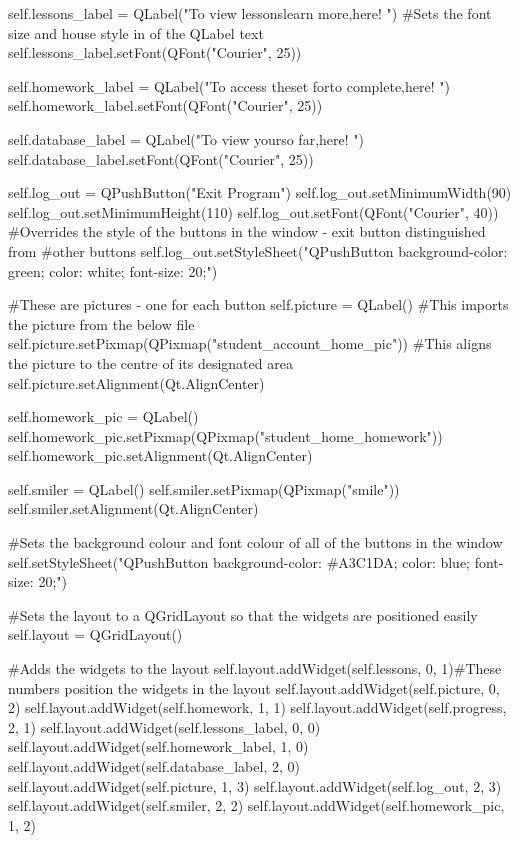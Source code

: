 \begin{landscape}
\begin{python}
        self.lessons_label = QLabel("To view lessons\nand learn more,\nclick here! ")
        #Sets the font size and house style in of the QLabel text
        self.lessons_label.setFont(QFont("Courier", 25))
        
        self.homework_label = QLabel("To access the\nhomework set for\nyou to complete,\nclick here! ")
        self.homework_label.setFont(QFont("Courier", 25))
        
        self.database_label = QLabel("To view your\nprogress so far,\nclick here! ")
        self.database_label.setFont(QFont("Courier", 25))
        
        self.log_out = QPushButton("Exit Program")
        self.log_out.setMinimumWidth(90)
        self.log_out.setMinimumHeight(110)
        self.log_out.setFont(QFont("Courier", 40))
        #Overrides the style of the buttons in the window - exit button distinguished from
        #other buttons
        self.log_out.setStyleSheet("QPushButton {background-color: green; color: white; font-size: 20;}")

        #These are pictures - one for each button
        self.picture = QLabel()
        #This imports the picture from the below file
        self.picture.setPixmap(QPixmap("student_account_home_pic"))
        #This aligns the picture to the centre of its designated area
        self.picture.setAlignment(Qt.AlignCenter)
        
        self.homework_pic = QLabel()
        self.homework_pic.setPixmap(QPixmap("student_home_homework"))
        self.homework_pic.setAlignment(Qt.AlignCenter)  
        
        self.smiler = QLabel()
        self.smiler.setPixmap(QPixmap("smile"))
        self.smiler.setAlignment(Qt.AlignCenter)

        #Sets the background colour and font colour of all of the buttons in the window
        self.setStyleSheet("QPushButton {background-color: #A3C1DA; color: blue; font-size: 20;}")

        #Sets the layout to a QGridLayout so that the widgets are positioned easily
        self.layout = QGridLayout()

        #Adds the widgets to the layout
        self.layout.addWidget(self.lessons, 0, 1)#These numbers position the widgets in the layout
        self.layout.addWidget(self.picture, 0, 2)
        self.layout.addWidget(self.homework, 1, 1)
        self.layout.addWidget(self.progress, 2, 1)
        self.layout.addWidget(self.lessons_label, 0, 0)
        self.layout.addWidget(self.homework_label, 1, 0)
        self.layout.addWidget(self.database_label, 2, 0)
        self.layout.addWidget(self.picture, 1, 3)
        self.layout.addWidget(self.log_out, 2, 3)
        self.layout.addWidget(self.smiler, 2, 2)
        self.layout.addWidget(self.homework_pic, 1, 2)


\end{python}
\end{landscape}

